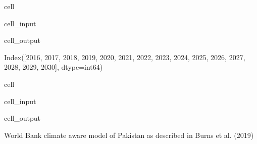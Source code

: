 \documentclass[letterpaper,10pt,english]{jupyterBook}
\begin{document}
\begin{sphinxuseclass}{cell}\begin{sphinxVerbatimInput}

\begin{sphinxuseclass}{cell_input}
\begin{sphinxVerbatim}[commandchars=\\\{\}]
\end{sphinxVerbatim}

\end{sphinxuseclass}\end{sphinxVerbatimInput}
\begin{sphinxVerbatimOutput}

\begin{sphinxuseclass}{cell_output}
\begin{sphinxVerbatim}[commandchars=\\\{\}]
Index([2016, 2017, 2018, 2019, 2020, 2021, 2022, 2023, 2024, 2025, 2026, 2027,
       2028, 2029, 2030],
      dtype=\PYGZsq{}int64\PYGZsq{})
\end{sphinxVerbatim}

\end{sphinxuseclass}\end{sphinxVerbatimOutput}

\end{sphinxuseclass}
\begin{sphinxuseclass}{cell}\begin{sphinxVerbatimInput}

\begin{sphinxuseclass}{cell_input}
\begin{sphinxVerbatim}[commandchars=\\\{\}]
\end{sphinxVerbatim}

\end{sphinxuseclass}\end{sphinxVerbatimInput}
\begin{sphinxVerbatimOutput}

\begin{sphinxuseclass}{cell_output}
\begin{sphinxVerbatim}[commandchars=\\\{\}]
\PYGZsq{}World Bank climate aware model of Pakistan as described in Burns et al. (2019)\PYGZsq{}
\end{sphinxVerbatim}

\end{sphinxuseclass}\end{sphinxVerbatimOutput}

\end{sphinxuseclass}
\end{document}
